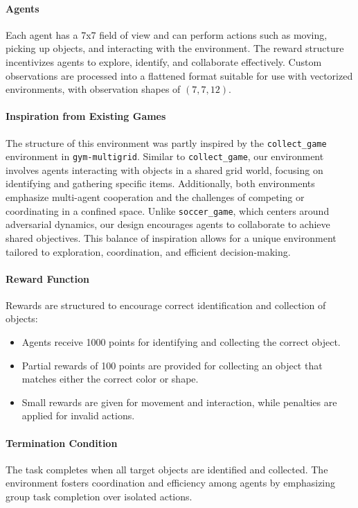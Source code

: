 \documentclass[11pt]{article}
\begin{document}
\paragraph{Agents} 
Each agent has a 7x7 field of view and can perform actions such as moving, picking up objects, and interacting with the environment. The reward structure incentivizes agents to explore, identify, and collaborate effectively. Custom observations are processed into a flattened format suitable for use with vectorized environments, with observation shapes of $(7, 7, 12)$.

\paragraph{Inspiration from Existing Games}
The structure of this environment was partly inspired by the \texttt{collect\_game} environment in \texttt{gym-multigrid}. Similar to \texttt{collect\_game}, our environment involves agents interacting with objects in a shared grid world, focusing on identifying and gathering specific items. Additionally, both environments emphasize multi-agent cooperation and the challenges of competing or coordinating in a confined space. Unlike \texttt{soccer\_game}, which centers around adversarial dynamics, our design encourages agents to collaborate to achieve shared objectives. This balance of inspiration allows for a unique environment tailored to exploration, coordination, and efficient decision-making.

\paragraph{Reward Function} 
Rewards are structured to encourage correct identification and collection of objects:
\begin{itemize}
    \item Agents receive 1000 points for identifying and collecting the correct object.
    \item Partial rewards of 100 points are provided for collecting an object that matches either the correct color or shape.
    \item Small rewards are given for movement and interaction, while penalties are applied for invalid actions.
\end{itemize}

\paragraph{Termination Condition} 
The task completes when all target objects are identified and collected. The environment fosters coordination and efficiency among agents by emphasizing group task completion over isolated actions.
\end{document}
